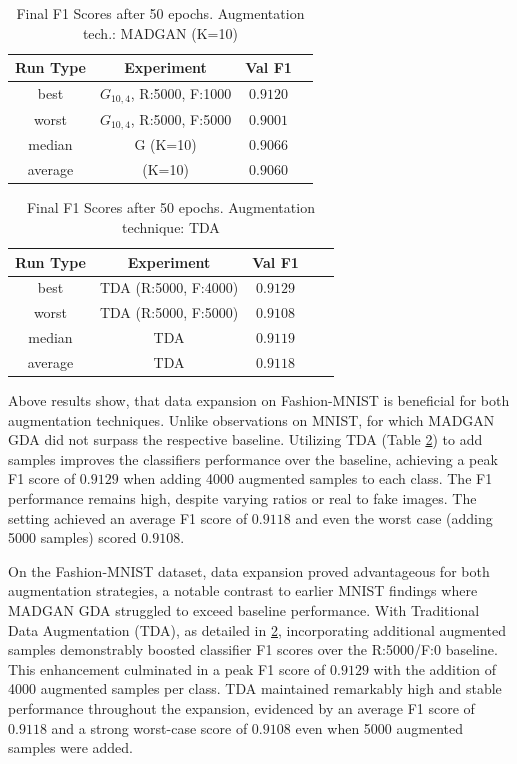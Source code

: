 \begin{table}[H]
	\vspace{-1.5em}
	\centering
	\begin{tabular}{|c|c|c|c|}
		\hline
		Run Type & Experiment & Val F1 \\ \hline
		best & \(G_{10, 4}\), R:5000, F:1000 & $0.9120$\\ \hline
		worst & \(G_{10, 4}\), R:5000, F:5000 & $0.9001$\\ \hline
		median & G (K=10) & $0.9066$\\ \hline
		average & (K=10) & $0.9060$
		\\ \hline
	\end{tabular}
    \caption{Final F1 Scores after 50 epochs. Augmentation tech.: MADGAN (K=10)}
        \label{tab:res_expansion_fashion_tda_vs_madgan__madgan}
\end{table}
\begin{table}[H]
	\centering
	\vspace{-1.5em}
	\begin{tabular}{|c|c|c|c|c|}
		\hline
		Run Type & Experiment & Val F1 \\ \hline
		best & TDA (R:5000, F:4000) & $0.9129$\\ \hline
		worst & TDA (R:5000, F:5000) & $0.9108$\\ \hline
		median & TDA & $0.9119$\\ \hline
		average & TDA & $0.9118$
		\\ \hline
	\end{tabular}
    \caption{Final F1 Scores after 50 epochs. Augmentation technique: TDA}
        \label{tab:res_expansion_fashion_tda_vs_madgan__tda}
\end{table}

Above results show, that data expansion on Fashion-MNIST is beneficial for both augmentation techniques. Unlike observations on MNIST, for which MADGAN GDA did not surpass the respective baseline. Utilizing TDA (Table \ref{tab:res_expansion_fashion_tda_vs_madgan__tda}) to add samples improves the classifiers performance over the baseline, achieving a peak F1 score of $0.9129$ when adding 4000 augmented samples to each class. The F1 performance remains high, despite varying ratios or real to fake images. The setting achieved an average F1 score of $0.9118$ and even the worst case (adding 5000 samples) scored $0.9108$.

On the Fashion-MNIST dataset, data expansion proved advantageous for both augmentation strategies, a notable contrast to earlier MNIST findings where MADGAN GDA struggled to exceed baseline performance. With Traditional Data Augmentation (TDA), as detailed in \ref{tab:res_expansion_fashion_tda_vs_madgan__tda}, incorporating additional augmented samples demonstrably boosted classifier F1 scores over the R:5000/F:0 baseline. This enhancement culminated in a peak F1 score of $0.9129$ with the addition of 4000 augmented samples per class. TDA maintained remarkably high and stable performance throughout the expansion, evidenced by an average F1 score of $0.9118$ and a strong worst-case score of $0.9108$ even when 5000 augmented samples were added.

